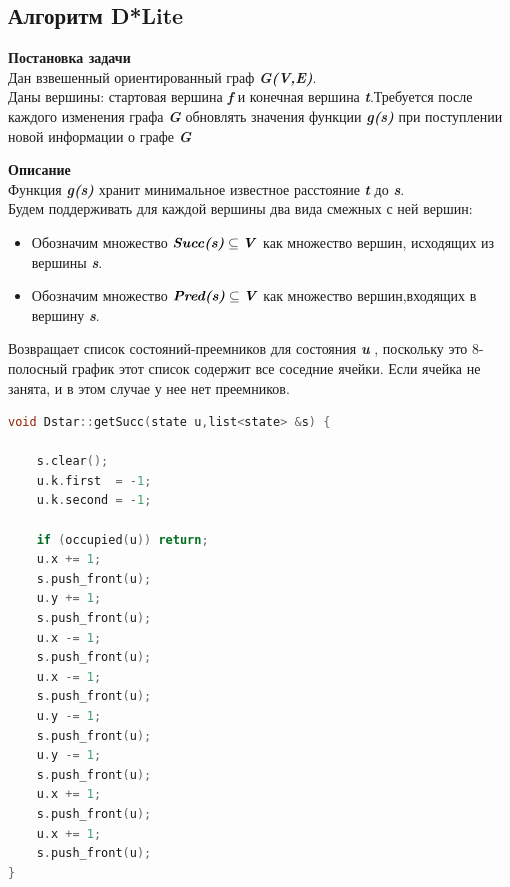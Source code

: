 \documentclass[12pt]{article}
\begin{document}
\subsection*{Алгоритм D*Lite}
\textbf{Постановка задачи}\\
Дан взвешенный ориентированный граф \textbf{\emph{G(V,E)}}.\\
Даны вершины: стартовая вершина \textbf{\emph{f}} и конечная вершина \textbf{\emph{t}}.Требуется после каждого изменения графа \textbf{\emph{G}} обновлять значения функции \textbf{\emph{g(s)}} при поступлении новой информации о графе  \textbf{\emph{G}}

\textbf{Описание}\\
Функция \textbf{\emph{g(s)}} хранит минимальное известное расстояние \textbf{\emph{t}} до \textbf{\emph{s}}.\\ 
Будем поддерживать для каждой вершины два вида смежных с ней вершин:
\begin{itemize}
  \item Обозначим множество $\textbf{\emph{Succ(s)}} \subseteq \textbf{\emph{V}}$ как множество вершин, исходящих из вершины \textbf{\emph{s}}.
  \item Обозначим множество $\textbf{\emph{Pred(s)}} \subseteq \textbf{\emph{V}}$ как множество вершин,входящих в вершину \textbf{\emph{s}}.
\end{itemize}
Возвращает список состояний-преемников для состояния \textbf{\emph{u}} , поскольку это 8-полосный график этот список содержит все соседние ячейки. Если ячейка  не занята, и в этом случае у нее нет преемников.
\begin{lstlisting}[language=C,style=C]
void Dstar::getSucc(state u,list<state> &s) {

    s.clear();
    u.k.first  = -1;
    u.k.second = -1;

    if (occupied(u)) return;
    u.x += 1;
    s.push_front(u);
    u.y += 1;
    s.push_front(u);
    u.x -= 1;
    s.push_front(u);
    u.x -= 1;
    s.push_front(u);
    u.y -= 1;
    s.push_front(u);
    u.y -= 1;
    s.push_front(u);
    u.x += 1;
    s.push_front(u);
    u.x += 1;
    s.push_front(u);
}
\end{lstlisting}
\end{document}
